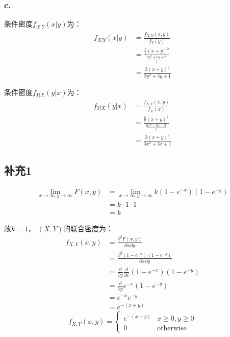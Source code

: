 \documentclass[a4paper,12pt]{ctexart}
\begin{document}
\subsubsection*{c.}

条件密度$f_{X|Y}(x|y)$为：
\begin{align*}
	f_{X|Y}(x|y) &= \frac{f_{X,Y}(x,y)}{f_Y(y)} \\
	&= \frac{\frac{6}{7} (x + y)^2}{\frac{6y^2 + 6y + 2}{7}} \\
	&= \frac{3(x + y)^2}{3y^2 + 3y + 1}
\end{align*}

条件密度$f_{Y|X}(y|x)$为：
\begin{align*}
	f_{Y|X}(y|x) &= \frac{f_{X,Y}(x,y)}{f_X(x)} \\
	&= \frac{\frac{6}{7} (x + y)^2}{\frac{6x^2 + 6x + 2}{7}} \\
	&= \frac{3(x + y)^2}{3x^2 + 3x + 1}
\end{align*}

\subsection*{补充1}

\begin{align*}
	\lim_{x \rightarrow \infty, y \rightarrow \infty} F(x,y) &= \lim_{x \rightarrow \infty, y \rightarrow \infty} k(1-e^{-x})(1-e^{-y}) \\
	&= k \cdot 1 \cdot 1 \\
	&= k
\end{align*}

故$k = 1$，
$(X,Y)$的联合密度为：
\begin{align*}
	f_{X,Y}(x,y) &= \frac{\partial^2 F(x,y)}{\partial x \partial y} \\
	&= \frac{\partial^2 (1-e^{-x})(1-e^{-y})}{\partial x \partial y} \\
	&= \frac{\partial}{\partial y} \frac{\partial}{\partial x} (1-e^{-x})(1-e^{-y}) \\
	&= \frac{\partial}{\partial y} e^{-x} (1 - e^{-y}) \\
	&= e^{-x} e^{-y} \\
	&= e^{-(x+y)}
\end{align*}
\begin{equation*}
	f_{X,Y}(x,y) = 
	\begin{cases}
		e^{-(x+y)} & x \geq 0, y \geq 0 \\
		0 & \text{otherwise}
	\end{cases}
\end{equation*}
\end{document}
